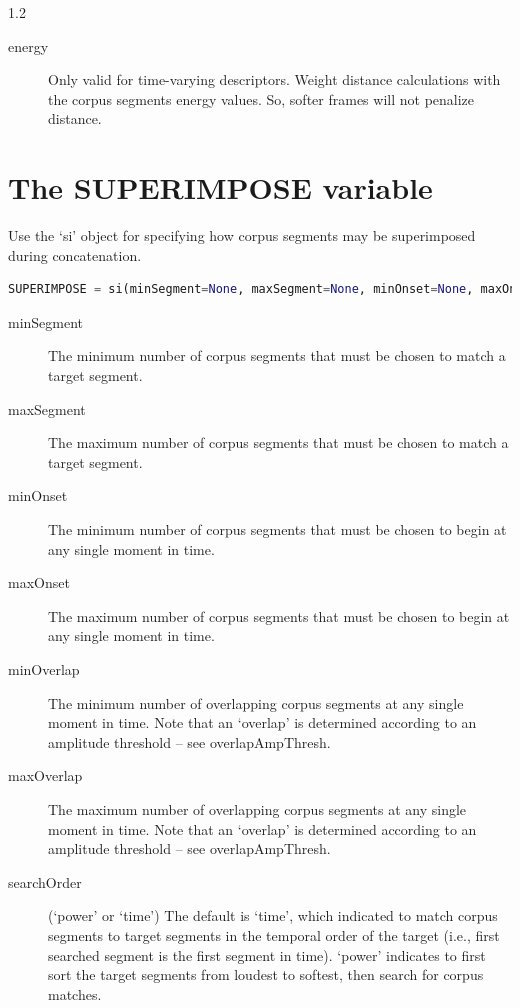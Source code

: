 \documentclass{article}
\begin{document}
\begin{spacing}{1.2}
\begin{description}
\item[energy] Only valid for time-varying descriptors.  Weight distance calculations with the corpus segments energy values.  So, softer frames will not penalize distance.
\end{description}


\section{The SUPERIMPOSE variable}
Use the `si' object for specifying how corpus segments may be superimposed during concatenation.

 \begin{lstlisting}[language=python]
SUPERIMPOSE = si(minSegment=None, maxSegment=None, minOnset=None, maxOnset=8, minOverlap=None, maxOverlap=None, searchOrder='power', calcMethod='mixture', peakAlign=False)
\end{lstlisting}
 
\begin{description}

\item[minSegment] The minimum number of corpus segments that must be chosen to match a target segment.
\item[maxSegment] The maximum number of corpus segments that must be chosen to match a target segment.
\item[minOnset] The minimum number of corpus segments that must be chosen to begin at any single moment in time.
\item[maxOnset] The maximum number of corpus segments that must be chosen to begin at any single moment in time.
\item[minOverlap] The minimum number of overlapping corpus segments at any single moment in time.  Note that an `overlap' is determined according to an amplitude threshold -- see overlapAmpThresh.
\item[maxOverlap] The maximum number of overlapping corpus segments at any single moment in time.  Note that an `overlap' is determined according to an amplitude threshold -- see overlapAmpThresh.


\item[searchOrder] (`power' or `time')  The default is `time', which indicated to match corpus segments to target segments in the temporal order of the target (i.e., first searched segment is the first segment in time).  `power' indicates to first sort the target segments from loudest to softest, then search for corpus matches.


\end{description}
\end{spacing}
\end{document}
